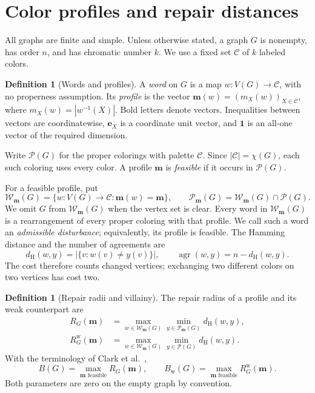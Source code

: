 \documentclass[10pt,a4paper]{amsart}
\numberwithin{equation}{section}
\theoremstyle{definition}
\newtheorem{definition}[theorem]{Definition}
\theoremstyle{remark}
\begin{document}
\section{Color profiles and repair distances}\label{sec:preliminaries}

All graphs are finite and simple. Unless otherwise stated, a graph $G$ is
nonempty, has order $n$, and has chromatic number $k$. We use a fixed set
$\mathcal C$ of $k$ labeled colors.

\begin{definition}[Words and profiles]\label{def:profile}
A \emph{word} on $G$ is a map
$w:V(G)\to\mathcal C$, with no properness assumption. Its \emph{profile}
is the vector $\mathbf m(w)=(m_X(w))_{X\in\mathcal C}$, where
$m_X(w)=|w^{-1}(X)|$. Bold letters denote vectors. Inequalities between
vectors are coordinatewise, $\mathbf e_X$ is a coordinate unit vector,
and $\mathbf1$ is an all-one vector of the required dimension.

Write $\mathcal P(G)$ for the proper colorings with palette $\mathcal C$.
Since $|\mathcal C|=\chi(G)$, each such coloring uses every color. A profile
$\mathbf m$ is \emph{feasible} if it occurs in $\mathcal P(G)$.
\end{definition}

For a feasible profile, put
\[
 \mathcal W_{\mathbf m}(G)=
 \{w:V(G)\to\mathcal C:\mathbf m(w)=\mathbf m\},\qquad
 \mathcal P_{\mathbf m}(G)=\mathcal W_{\mathbf m}(G)\cap\mathcal P(G).
\]
We omit $G$ from $\mathcal W_{\mathbf m}(G)$ when the vertex set is clear.
Every word in $\mathcal W_{\mathbf m}(G)$ is a rearrangement of every
proper coloring with that profile. We call such a word an
\emph{admissible disturbance}; equivalently, its profile is feasible.
The Hamming distance and the number
of agreements are
\[
 d_{\mathrm H}(w,y)=|\{v:w(v)\ne y(v)\}|,
 \qquad \operatorname{agr}(w,y)=n-d_{\mathrm H}(w,y).
\]
The cost therefore counts changed vertices; exchanging two different
colors on two vertices has cost two.

\begin{definition}[Repair radii and villainy]\label{def:repair-radii}
The repair radius of a profile and its weak counterpart are
\begin{align*}
 R_G(\mathbf m)&=
 \max_{w\in\mathcal W_{\mathbf m}(G)}
 \min_{y\in\mathcal P_{\mathbf m}(G)}d_{\mathrm H}(w,y),\\
 R^{\mathrm w}_G(\mathbf m)&=
 \max_{w\in\mathcal W_{\mathbf m}(G)}
 \min_{y\in\mathcal P(G)}d_{\mathrm H}(w,y).
\end{align*}
With the terminology of Clark et al.~\cite{clark2006},
\[
 B(G)=\max_{\mathbf m\text{ feasible}}R_G(\mathbf m),\qquad
 B_{\mathrm w}(G)=\max_{\mathbf m\text{ feasible}}R^{\mathrm w}_G(\mathbf m).
\]
Both parameters are zero on the empty graph by convention.
\end{definition}
\end{document}
